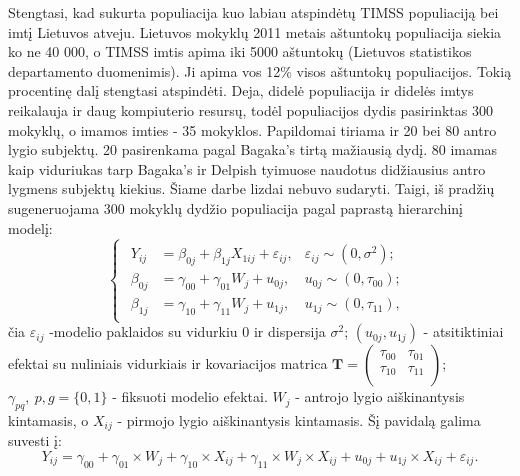 \documentclass[11pt,a4paper]{article}
\begin{document}
\indent Stengtasi, kad sukurta populiacija kuo labiau atspindėtų TIMSS populiaciją bei imtį Lietuvos atveju. Lietuvos mokyklų 2011 metais aštuntokų populiacija siekia ko ne 40 000, o TIMSS imtis apima iki 5000 aštuntokų (Lietuvos statistikos departamento duomenimis). Ji apima vos 12\% visos aštuntokų populiacijos. Tokią procentinę dalį stengtasi atspindėti. Deja, didelė populiacija ir didelės imtys reikalauja ir daug kompiuterio resursų, todėl populiacijos dydis pasirinktas 300 mokyklų, o imamos imties - 35 mokyklos. Papildomai tiriama ir 20 bei 80 antro lygio subjektų. 20 pasirenkama pagal Bagaka's\cite{bagaka} tirtą mažiausią dydį. 80 imamas kaip viduriukas tarp Bagaka's ir Delpish tyimuose naudotus didžiausius antro lygmens subjektų kiekius. Šiame darbe lizdai nebuvo sudaryti. Taigi, iš pradžių sugeneruojama 300 mokyklų dydžio populiacija pagal paprastą hierarchinį modelį:
\begin{equation}\label{eq:simul}
\left\{
\begin{array}{l}
\begin{split}
Y_{ij}&=\beta_{0j}+\beta_{1j}X_{1ij}+\varepsilon_{ij}, &\varepsilon_{ij}\sim (0, \sigma^2);\\
\beta_{0j}&=\gamma_{00}+\gamma_{01}W_j+u_{0j}, & u_{0j}\sim (0, \tau_{00});\\
\beta_{1j}&=\gamma_{10}+\gamma_{11}W_j+u_{1j}, & u_{1j}\sim (0, \tau_{11}),
\end{split}
\end{array} \right.
\end{equation}
čia $\varepsilon_{ij}$ -modelio paklaidos su vidurkiu $0$ ir dispersija $\sigma^2$; $\left(u_{0j}, u_{1j}\right)$ - atsitiktiniai efektai su nuliniais vidurkiais ir kovariacijos matrica $\mathbf{T}=\begin{pmatrix}
\tau_{00} & \tau_{01} \\
\tau_{10} & \tau_{11} \\
\end{pmatrix}$; $\gamma_{pq},\ p,g = \{0,1\}$ - fiksuoti modelio efektai. $W_j$ - antrojo lygio aiškinantysis kintamasis, o $X_{ij}$ - pirmojo lygio aiškinantysis kintamasis. Šį pavidalą galima suvesti į:
\begin{equation} \label{eq:deq}
Y_{ij} = \gamma_{00} +\gamma_{01}\times W_{j}+ \gamma_{10}\times X_{ij}+\gamma_{11}\times W_{j}\times X_{ij}+u_{0j}+u_{1j}\times X_{ij}+\varepsilon_{ij}.
\end{equation}
\end{document}

